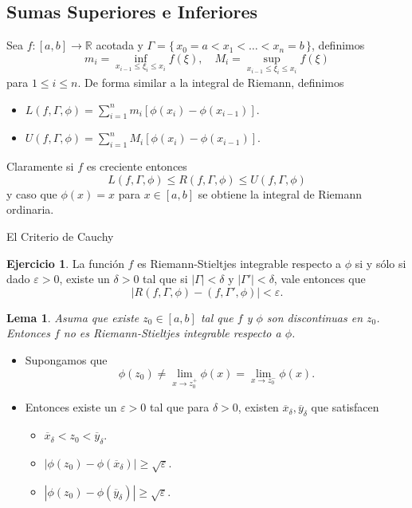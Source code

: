 \documentclass[utf8]{beamer}
\theoremstyle{plain}
\newtheorem{Lem}{Lema}                 %
\theoremstyle{definition}
\newtheorem{Ej}{Ejercicio}             %
\theoremstyle{remark}
\numberwithin{equation}{section}
\newcommand{\dl}{\delta}                %
\newcommand{\eps}{\varepsilon}          %
\newcommand{\Ga}{\Gamma}                %
\newcommand{\bR}{\mathbb{R}}    %
\newcommand{\set}[1]{\{\,#1\,\}}    %
\renewcommand{\geq}{\geqslant}          %
\renewcommand{\leq}{\leqslant}          %
\newcommand{\ov}{\overline}
\renewcommand{\.}{\Cdot}                %
\begin{document}
\subsection{Sumas Superiores e Inferiores}

\begin{frame}
  Sea $f:[a,b]\to\bR$ acotada y $\Ga=\set{x_0=a<x_1<\dots<x_n=b}$, definimos 
  $$m_i=\inf_{x_{i-1}\leq\xi_i\leq x_i} f(\xi),\quad M_i=\sup_{x_{i-1}\leq\xi_i\leq x_i} f(\xi)$$
  para $1\leq i\leq n$. De forma similar a la integral de Riemann, definimos
  \begin{itemize}
    \item $L(f,\Ga,\phi)=\sum_{i=1}^nm_i[\phi(x_i)-\phi(x_{i-1})].$
    \item $U(f,\Ga,\phi)=\sum_{i=1}^nM_i[\phi(x_i)-\phi(x_{i-1})].$
  \end{itemize}
  Claramente si $f$ es creciente entonces
  $$L(f,\Ga,\phi)\leq R(f,\Ga,\phi)\leq U(f,\Ga,\phi)$$
  y caso que $\phi(x)=x$ para $x\in [a,b]$ se obtiene la integral de Riemann ordinaria.
\end{frame}

\begin{frame}{El Criterio de Cauchy}
  \begin{Ej}\label{ej:CauchyRS}
    La función $f$ es Riemann-Stieltjes integrable respecto a $\phi$ si y sólo si dado $\eps>0$, existe un $\dl>0$ tal que si $|\Ga|<\dl$ y $|\Ga'|<\dl$, vale entonces que
    $$|R(f,\Ga,\phi)-(f,\Ga',\phi)|<\eps.$$
  \end{Ej}
\end{frame}

\begin{frame}
  \begin{Lem}\label{lem:NotRSIntCuando}
Asuma que existe $z_0\in [a,b]$ tal que $f$ y $\phi$ son discontinuas en $z_0$. Entonces $f$ no es Riemann-Stieltjes integrable respecto a $\phi$.
    \end{Lem}\begin{itemize}
      \item  Supongamos que 
    $$\phi(z_0)\neq\lim_{x\to z_0^+}\phi(x)=\lim_{x\to z_0^-}\phi(x).$$
    \item Entonces existe un $\eps>0$ tal que para $\dl>0$, existen $\ov x_\dl,\ov y_\dl$ que satisfacen 
    \begin{itemize}
      \item $\ov x_\dl<z_0<\ov y_\dl$.
      \item $|\phi(z_0)-\phi(\ov x_\dl)|\geq\sqrt{\eps}$.
      \item $|\phi(z_0)-\phi(\ov y_\dl)|\geq\sqrt{\eps}$.
    \end{itemize}
    \end{itemize}
\end{frame}
\end{document}
